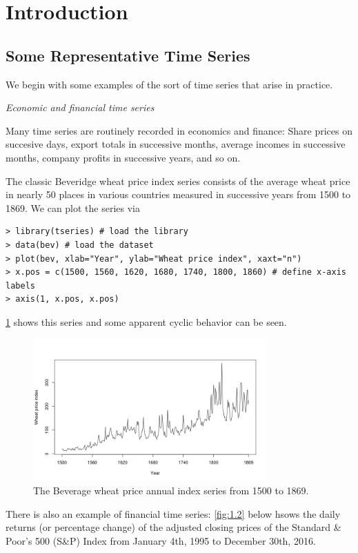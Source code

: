 \section{Introduction}



\subsection{Some Representative Time Series}
We begin with some examples of the sort of time series that arise in practice.

\textit{Economic and financial time series}

Many time series are routinely recorded in economics and finance: Share prices on succesive days, export totals in successive months, average incomes in successive months, company profits in successive years, and so on.

The classic Beveridge wheat price index series consists of the average wheat price in nearly 50 places in various countries measured in successive years from 1500 to 1869. We can plot the series via 
\begin{verbatim}
> library(tseries) # load the library
> data(bev) # load the dataset
> plot(bev, xlab="Year", ylab="Wheat price index", xaxt="n")
> x.pos = c(1500, 1560, 1620, 1680, 1740, 1800, 1860) # define x-axis labels
> axis(1, x.pos, x.pos)
\end{verbatim}
\cref{fig:1.1} shows this series and some apparent cyclic behavior can be seen.

\begin{figure}[h]
	\centering
	\includegraphics[width=0.8\textwidth]{Chapter 1/fig1-1.png}
	\caption{The Beverage wheat price annual index series from 1500 to 1869.}
	\label{fig:1.1}
\end{figure}

There is also an example of financial time series: \cref{fig:1.2} below hsows the daily returns (or percentage change) of the adjusted closing prices of the Standard \& Poor's 500 (S\&P) Index from January 4th, 1995 to December 30th, 2016.

